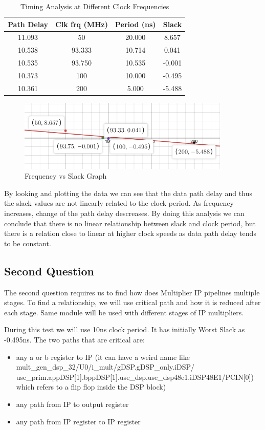 \documentclass{report}
\begin{document}
\begin{table}[!h]
    \centering
    \caption{Timing Analysis at Different Clock Frequencies}
    \begin{tabular}{|c|c|c|c|}
    \hline
    \textbf{Path Delay} & \textbf{Clk frq (MHz)} & \textbf{Period (ns)} & \textbf{Slack} \\
    \hline
    11.093 & 50       & 20.000   & 8.657     \\
    10.538 & 93.333   & 10.714   & 0.041     \\
    10.535 & 93.750   & 10.535   & -0.001    \\
    10.373 & 100      & 10.000   & -0.495    \\
    10.361 & 200      & 5.000    & -5.488    \\
    \hline
    \end{tabular}
    \end{table}
    \begin{figure}[h!]
        \centering
        \includegraphics[width=0.9\textwidth]{images/delay_graph.png}
        \caption{Frequency vs Slack Graph}
        \label{fig:slack_freq_path}
    \end{figure}
By looking and plotting the data we can see that the data path delay and thus the slack values are not linearly related to the clock period.
As frequency increases, change of the path delay descreases.
By doing this analysis we can conclude that there is no linear relationship between slack and clock period, but there is a relation close to linear at higher clock speeds as data path delay tends to be constant.

\subsection{Second Question}
The second question requires us to find how does Multiplier IP pipelines multiple stages.
To find a relationship, we will use critical path and how it is reduced after each stage. Same module will be used with different stages of IP multipliers.

During this test we will use 10ns clock period. It has initially Worst Slack as -0.495ns.
The two paths that are critical are:
\begin{itemize}
    \item any a or b register to IP (it can have a weird name like mult\_gen\_dsp\_32/U0/i\_mult/gDSP.gDSP\_only.iDSP/ use\_prim.appDSP[1].bppDSP[1].use\_dsp.use\_dsp48e1.iDSP48E1/PCIN[0]) which refers to a flip flop inside the DSP block)
    \item any path from IP to output register 
    \item any path from IP register to IP register
\end{itemize}
\end{document}
